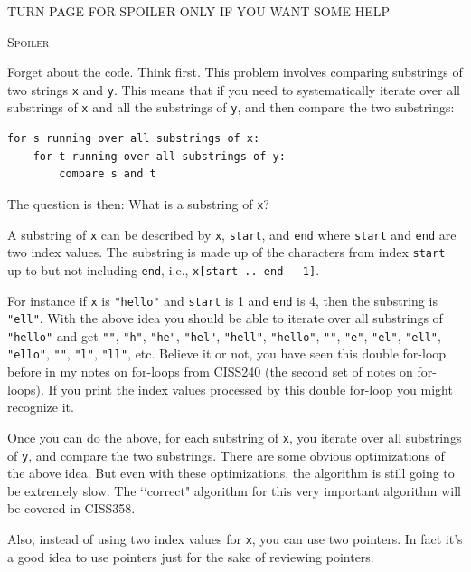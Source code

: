 TURN PAGE FOR SPOILER ONLY IF YOU WANT SOME HELP

\newpage
\textsc{Spoiler}

Forget about the code.
Think first.
This problem involves comparing substrings of two strings
\verb!x! and \verb!y!.
This means that if you need to systematically iterate over all substrings
of \verb!x! and all the substrings of \verb!y!,
and then compare the two substrings:
\begin{Verbatim}[fontsize=\small,frame=single]
for s running over all substrings of x:
    for t running over all substrings of y:
        compare s and t
\end{Verbatim}
The question is then: What is a substring of \verb!x!?

A substring of \verb!x! can be described by
\verb!x!, \verb!start!, and \verb!end!
where \verb!start! and \verb!end! are two index values.
The substring is made up of the characters from index
\verb!start! up to but not including \verb!end!, i.e.,
\verb!x[start .. end - 1]!.

For instance if \verb!x! is \verb!"hello"!
and \verb!start! is 1 and \verb!end! is 4, then the
substring is \verb!"ell"!.
With the above idea you should be able to iterate over
all substrings of \verb!"hello"! and get
\verb!""!,
\verb!"h"!,
\verb!"he"!,
\verb!"hel"!,
\verb!"hell"!,
\verb!"hello"!,
\verb!""!,
\verb!"e"!,
\verb!"el"!,
\verb!"ell"!,
\verb!"ello"!,
\verb!""!,
\verb!"l"!,
\verb!"ll"!,
etc.
Believe it or not, you have seen this double for-loop before in my
notes on for-loops from CISS240 (the second set of notes on for-loops).
If you print the index values processed by this double for-loop
you might recognize it.

Once you can do the above, for each substring of \verb!x!,
you iterate over all substrings of
\verb!y!, and compare the two substrings.
There are some obvious optimizations of the above idea.
But even with these optimizations, the algorithm is still going to be extremely
slow.
The \lq\lq correct" algorithm for this very important algorithm
will be covered in CISS358.

Also, instead of using two index values for \verb!x!, you can use
two pointers.
In fact it's a good idea to use pointers just for the sake of reviewing
pointers.

